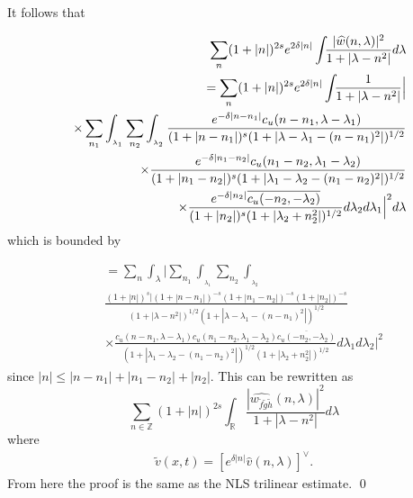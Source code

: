 \documentclass{beamer}
\numberwithin{equation}{section}
\newcommand{\wh}{\widehat}
\begin{document}
\begin{frame}
It follows that

\begin{eqnarray*}
&&\sum_{n } (1+|n|)^{2s}e^{2\delta |n|}
\int_{}
     \frac{|\widehat{w}(n, \lambda)|^2}{1+|\lambda -n^2|}
d\lambda
\\
&&
=\sum_{n  {}} (1+|n|)^{2s}e^{2\delta |n|}
\int_{}
     \frac{1}{1+|\lambda -n^2|}\Big \vert 
         \notag\\
&&
  \times  \sum_{n_1 {}}
     \int_{_{\lambda_1}}\sum_{n_2 {}}
     \int_{_{\lambda_2}}\frac{e^{-\delta |n-n_1|}c_u(n-n_1,\lambda-\lambda_1)}{(1+|n-n_1|)^s(1+|\lambda-\lambda_1-(n-n_1)^2|)^{1/2}}\notag\\
&&\times
\frac{e^{-\delta|n_1-n_2|}c_u(n_1-n_2,\lambda_1-\lambda_2)}{(1+|n_1-n_2|)^s(1+|\lambda_1-\lambda_2-(n_1-n_2)^2|)^{1/2}}
\\
&& \times \frac{e^{-\delta |n_2|}\overline{c_u(-n_2,-\lambda_2)}}{(1+|n_2|)^s(1+|\lambda_2+n_2^2|)^{1/2}}
d\lambda_2d\lambda_1 \Big \vert^2d\lambda
     \notag\\
   \end{eqnarray*}
   which is bounded by
 \end{frame}
   \begin{frame}
     \begin{eqnarray*}
      &&=\sum_{n  {}} 
\int_{\lambda}
     \Big \vert \sum_{n_1 {}}
     \int_{_{\lambda_1}}\sum_{n_2 {}}
     \int_{_{\lambda_2}}
     \\
     && \frac{(1 + |n|)^{s}|(1 + |n-n_1|)^{-s}(1 + |n_1-n_2|)^{-s}(1 + |n_2|)^{-s}}{(1+|\lambda -n^2|)^{1/2}(1+|\lambda-\lambda_1-(n-n_1)^2|)^{1/2}}\\
     &&\times \frac{c_u(n-n_1,\lambda-\lambda_1)c_u(n_1-n_2,\lambda_1-\lambda_2)\overline{c_u(-n_2,-\lambda_2)}}{(1+|\lambda_1-\lambda_2-(n_1-n_2)^2|)^{1/2}
     (1+|\lambda_2+n_2^2|)^{1/2}}d\lambda_1d\lambda_2 \Big \vert^2
\end{eqnarray*}
since $|n|\le |n-n_1|+ |n_1-n_2|+|n_2|$. This can be rewritten as
\begin{equation*}
  \sum_{n \in {\mathbb{Z}}} (1+|n|)^{2s}
\int_{\mathbb{R}}
\frac{|\widehat{w_{\tilde{f}\tilde{g}\tilde{h}}}(n, \lambda)|^2}{1+|\lambda -n^2|}
d\lambda
\end{equation*}
where
%
%
\begin{equation*}
\begin{split}
  \tilde{v}(x,t) = \left[ e^{\delta | n |} \wh{v}(n, \lambda) \right]^{\vee}.
\end{split}
\end{equation*}
%
%
From here the proof is the same as the NLS trilinear estimate. \qed
\end{frame}
\end{document}
